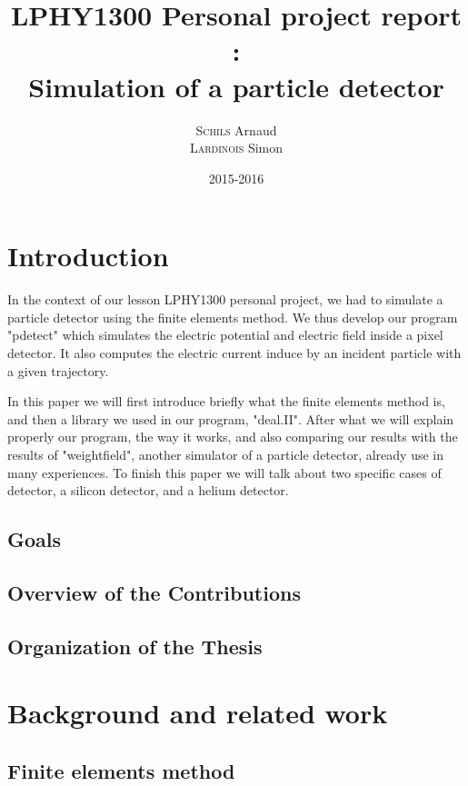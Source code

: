 \documentclass[11pt]{article}
\title{LPHY1300 Personal project report :\\ Simulation of a particle detector}
\author{\textsc{Schils} Arnaud\\ \textsc{Lardinois} Simon}
\date{2015-2016}
\begin{document}
\maketitle
\newpage
\renewcommand{\contentsname}{Table of contents}
\tableofcontents




\newpage
\section*{Introduction}

	In the context of our lesson LPHY1300 personal project, we
	had to simulate a particle detector using the finite elements method. We
	thus develop our program "pdetect" which simulates the electric potential
	and electric field inside a pixel detector. It also computes the electric
	current induce by an incident particle with a given trajectory.

	In this paper we will first introduce briefly what the finite elements
	method is, and then a library we used in our program, "deal.II".
	After what we will explain properly our program, the way it works, and
	also comparing our results with the results of "weightfield", another
	simulator of a particle detector, already use in many experiences.
	To finish this paper we will talk about two specific cases of detector,
	a silicon detector, and a helium detector.

	\subsection*{Goals}

	\subsection*{Overview of the Contributions}

	\subsection*{Organization of the Thesis}

\section{Background and related work}

	\subsection{Finite elements method}
\end{document}
